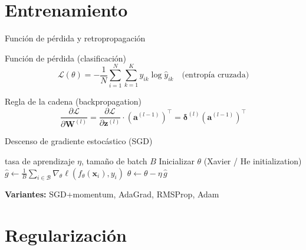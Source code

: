 \documentclass[aspectratio=169,12pt]{beamer}
\newcommand{\vect}[1]{\bm{#1}}
\newcommand{\mat}[1]{\mathbf{#1}}
\begin{document}
\section{Entrenamiento}

\begin{frame}{Función de pérdida y retropropagación}
  \begin{block}{Función de pérdida (clasificación)}
    \begin{equation}
      \mathcal{L}(\theta) = -\frac{1}{N}\sum_{i=1}^{N}\sum_{k=1}^{K}
      y_{ik}\log\hat{y}_{ik}
      \quad\text{(entropía cruzada)}
    \end{equation}
  \end{block}
  \vspace{0.3em}
  \begin{block}{Regla de la cadena (backpropagation)}
    \begin{equation}
      \frac{\partial \mathcal{L}}{\partial \mat{W}^{(l)}}
      = \frac{\partial \mathcal{L}}{\partial \vect{z}^{(l)}}
        \cdot \left(\vect{a}^{(l-1)}\right)^\top
      = \bm{\delta}^{(l)}\left(\vect{a}^{(l-1)}\right)^\top
    \end{equation}
  \end{block}
\end{frame}

\begin{frame}{Descenso de gradiente estocástico (SGD)}
  \begin{algorithm}[H]
    \caption{Mini-batch SGD}
    \begin{algorithmic}[1]
      \Require tasa de aprendizaje $\eta$, tamaño de batch $B$
      \State Inicializar $\theta$ (Xavier / He initialization)
          \State $\hat{g} \leftarrow \frac{1}{B}\sum_{i\in\mathcal{B}}\nabla_\theta\ell(f_\theta(\vect{x}_i), y_i)$
          \State $\theta \leftarrow \theta - \eta\,\hat{g}$
        \EndFor
      \EndFor
    \end{algorithmic}
  \end{algorithm}
  \vspace{0.3em}
  \textbf{Variantes:} SGD+momentum, AdaGrad, RMSProp, \alert{Adam}
\end{frame}

\section{Regularización}
\end{document}
